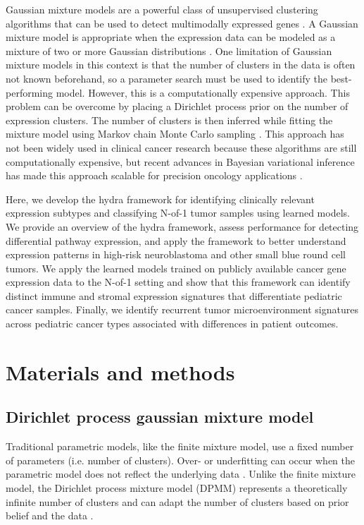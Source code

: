 \documentclass[10pt,letterpaper]{article}
\begin{document}
Gaussian mixture models are a powerful class of unsupervised clustering algorithms that can be used to detect multimodally expressed genes \cite{ghoshMixtureModelsAssessing2004,dahlModelBasedClusteringExpression2006,kimVariableSelectionClustering2006}. A Gaussian mixture model is appropriate when the expression data can be modeled as a mixture of two or more Gaussian distributions \cite{gelmanBayesianDataAnalysis2013}. One limitation of Gaussian mixture models in this context is that the number of clusters in the data is often not known beforehand, so a parameter search must be used to identify the best-performing model. However, this is a computationally expensive approach. This problem can be overcome by placing a Dirichlet process prior on the number of expression clusters. The number of clusters is then inferred while fitting the mixture model using Markov chain Monte Carlo sampling \cite{gelmanBayesianDataAnalysis2013}. This approach has not been widely used in clinical cancer research because these algorithms are still computationally expensive, but recent advances in Bayesian variational inference has made this approach scalable for precision oncology applications \cite{thallBayesianNonparametricStatistics2017}. 

Here, we develop the hydra framework for identifying clinically relevant expression subtypes and classifying N-of-1 tumor samples using learned models. We provide an overview of the hydra framework, assess performance for detecting differential pathway expression, and apply the framework to better understand expression patterns in high-risk neuroblastoma and other small blue round cell tumors. We apply the learned models trained on publicly available cancer gene expression data to the N-of-1 setting and show that this framework can identify distinct immune and stromal expression signatures that differentiate pediatric cancer samples. Finally, we identify recurrent tumor microenvironment signatures across pediatric cancer types associated with differences in patient outcomes.
  
\section*{Materials and methods}
\subsection*{Dirichlet process gaussian mixture model}

Traditional parametric models, like the finite mixture model, use a fixed number of parameters (i.e. number of clusters). Over- or underfitting can occur when the parametric model does not reflect the underlying data \cite{teh2010dirichlet}. Unlike the finite mixture model, the Dirichlet process mixture model (DPMM) represents a theoretically infinite number of clusters and can adapt the number of clusters based on prior belief and the data \cite{gelmanBayesianDataAnalysis2013, antoniakMixturesDirichletProcesses1974, teh2010dirichlet}.
\end{document}
